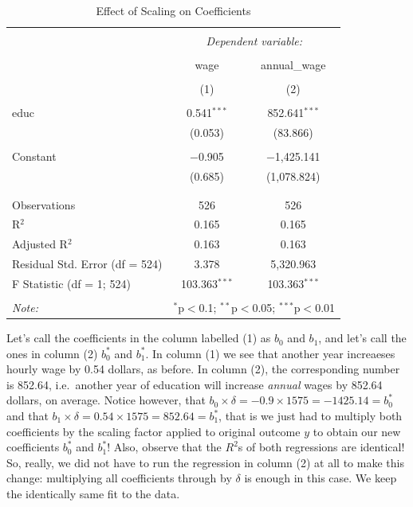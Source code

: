 \documentclass[]{book}
\begin{document}
\begin{table}[!htbp] \centering 
  \caption{Effect of Scaling on Coefficients} 
  \label{} 
\begin{tabular}{@{\extracolsep{5pt}}lcc} 
\\[-1.8ex]\hline 
\hline \\[-1.8ex] 
 & \multicolumn{2}{c}{\textit{Dependent variable:}} \\ 
\cline{2-3} 
\\[-1.8ex] & wage & annual\_wage \\ 
\\[-1.8ex] & (1) & (2)\\ 
\hline \\[-1.8ex] 
 educ & 0.541$^{***}$ & 852.641$^{***}$ \\ 
  & (0.053) & (83.866) \\ 
  & & \\ 
 Constant & $-$0.905 & $-$1,425.141 \\ 
  & (0.685) & (1,078.824) \\ 
  & & \\ 
\hline \\[-1.8ex] 
Observations & 526 & 526 \\ 
R$^{2}$ & 0.165 & 0.165 \\ 
Adjusted R$^{2}$ & 0.163 & 0.163 \\ 
Residual Std. Error (df = 524) & 3.378 & 5,320.963 \\ 
F Statistic (df = 1; 524) & 103.363$^{***}$ & 103.363$^{***}$ \\ 
\hline 
\hline \\[-1.8ex] 
\textit{Note:}  & \multicolumn{2}{r}{$^{*}$p$<$0.1; $^{**}$p$<$0.05; $^{***}$p$<$0.01} \\ 
\end{tabular} 
\end{table}

Let's call the coefficients in the column labelled (1) as \(b_0\) and
\(b_1\), and let's call the ones in column (2) \(b_0^*\) and \(b_1^*\).
In column (1) we see that another year increaeses hourly wage by 0.54
dollars, as before. In column (2), the corresponding number is 852.64,
i.e.~another year of education will increase \emph{annual} wages by
852.64 dollars, on average. Notice however, that
\(b_0 \times \delta = -0.9 \times 1575 = -1425.14 = b_0^*\) and that
\(b_1 \times \delta = 0.54 \times 1575 = 852.64 = b_1^*\), that is we
just had to multiply both coefficients by the scaling factor applied to
original outcome \(y\) to obtain our new coefficients \(b_0^*\) and
\(b_1^*\)! Also, observe that the \(R^2\)s of both regressions are
identical! So, really, we did not have to run the regression in column
(2) at all to make this change: multiplying all coefficients through by
\(\delta\) is enough in this case. We keep the identically same fit to
the data.
\end{document}
